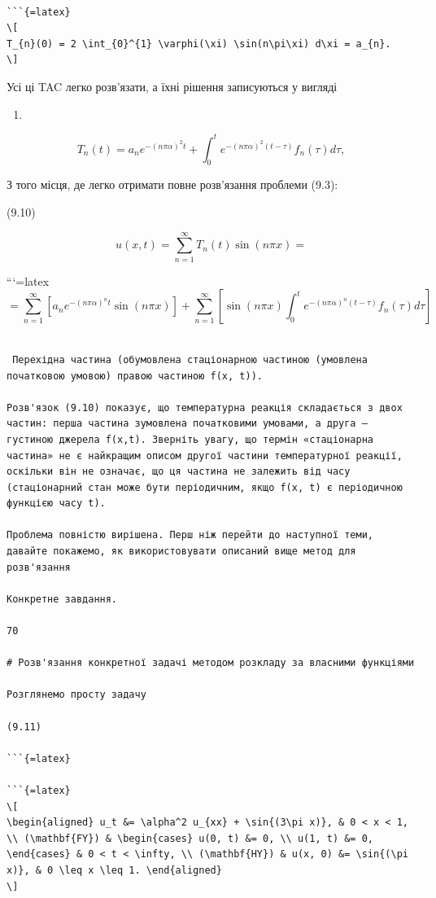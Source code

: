 \documentclass[
  ukrainian,
]{article}
\providecommand{\tightlist}{%
  \setlength{\itemsep}{0pt}\setlength{\parskip}{0pt}}
\begin{document}
\begin{verbatim}

```{=latex}
\[
T_{n}(0) = 2 \int_{0}^{1} \varphi(\xi) \sin(n\pi\xi) d\xi = a_{n}.
\]
\end{verbatim}

Усі ці TAC легко розв'язати, а їхні рішення записуються у вигляді

\begin{enumerate}
\def\labelenumi{(\arabic{enumi})}
\setcounter{enumi}{98}
\tightlist
\item
\end{enumerate}

\[
T_n(t) = a_n e^{-(n\pi\alpha)^2 t} + \int_0^t e^{-(n\pi\alpha)^2 (t-\tau)} f_n(\tau) d\tau,
\]

З того місця, де легко отримати повне розв'язання проблеми (9.3):

(9.10)

\[
u(x, t) = \sum_{n=1}^{\infty} T_n(t) \sin(n\pi x) =
\]

```{=latex}
\[
= \sum_{n=1}^{\infty} \left[ a_n e^{-(n\pi\alpha)^n t} \sin(n\pi x) \right] + \sum_{n=1}^{\infty} \left[ \sin(n\pi x) \int_0^t e^{-(n\pi\alpha)^n (t-\tau)} f_n(\tau) d\tau \right]
\]

\begin{verbatim}

 Перехідна частина (обумовлена стаціонарною частиною (умовлена початковою умовою) правою частиною f(x, t)).

Розв'язок (9.10) показує, що температурна реакція складається з двох частин: перша частина зумовлена початковими умовами, а друга — густиною джерела f(x,t). Зверніть увагу, що термін «стаціонарна частина» не є найкращим описом другої частини температурної реакції, оскільки він не означає, що ця частина не залежить від часу (стаціонарний стан може бути періодичним, якщо f(x, t) є періодичною функцією часу t).

Проблема повністю вирішена. Перш ніж перейти до наступної теми, давайте покажемо, як використовувати описаний вище метод для розв'язання

Конкретне завдання.

70

# Розв'язання конкретної задачі методом розкладу за власними функціями

Розглянемо просту задачу

(9.11)

```{=latex}

```{=latex}
\[
\begin{aligned} u_t &= \alpha^2 u_{xx} + \sin{(3\pi x)}, & 0 < x < 1, \\ (\mathbf{FY}) & \begin{cases} u(0, t) &= 0, \\ u(1, t) &= 0, \end{cases} & 0 < t < \infty, \\ (\mathbf{HY}) & u(x, 0) &= \sin{(\pi x)}, & 0 \leq x \leq 1. \end{aligned}
\]
\end{verbatim}
\end{document}
